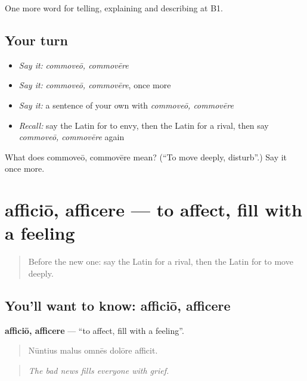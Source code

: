 \begin{grammarlens}[title={What you've built}]
One more word for telling, explaining and describing at B1.
\end{grammarlens}

\subsection*{Your turn}
\begin{itemize}
\raggedright
  \item \emph{Say it:} \emph{commoveō, commovēre}
  \item \emph{Say it:} \emph{commoveō, commovēre}, once more
  \item \emph{Say it:} a sentence of your own with \emph{commoveō, commovēre}
  \item \emph{Recall:} say the Latin for to envy, then the Latin for a rival, then say \emph{commoveō, commovēre} again
\end{itemize}

\begin{tcolorbox}[breakable,colback=teal!4,colframe=teal!35!black,title={Before you move on}]
What does commoveō, commovēre mean? (\textquotedblleft{}To move deeply, disturb\textquotedblright{}.) Say it once more.
\end{tcolorbox}
\section[afficiō, afficere]{afficiō, afficere — to affect, fill with a feeling}

\label{lesson:LA-C501-afficio}



\begin{quote}
Before the new one: say the Latin for a rival, then the Latin for to move deeply.
\end{quote}

\subsection*{You'll want to know: afficiō, afficere}
\textbf{afficiō, afficere} — \textquotedblleft{}to affect, fill with a feeling\textquotedblright{}.

\begin{quote}
Nūntius malus omnēs dolōre afficit.
\end{quote}

\begin{quote}
\emph{The bad news fills everyone with grief.}
\end{quote}

